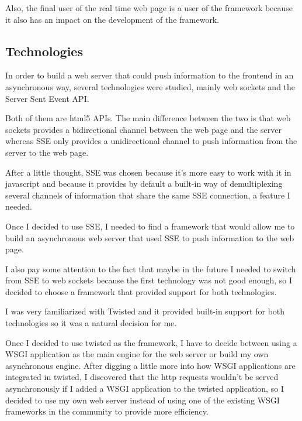 \documentclass[12pt]{article}
\begin{document}
            Also, the final user of the real time web page is a user of the
            framework because it also has an impact on the development of the
            framework.

        \subsection{Technologies}
            In order to build a web server that could push information to the
            frontend in an asynchronous way, several technologies were studied,
            mainly web sockets and the Server Sent Event API.

            Both of them are html5 APIs. The main difference between the two is
            that web sockets provides a bidirectional channel between the web
            page and the server whereas SSE only provides a unidirectional
            channel to push information from the server to the web page.

            After a little thought, SSE was chosen because it's more easy to
            work with it in javascript and because it provides by default a
            built-in way of demultiplexing several channels of information that
            share the same SSE connection, a feature I needed.
            
            Once I decided to use SSE, I needed to find a framework that would
            allow me to build an asynchronous web server that used SSE to push
            information to the web page.

            I also pay some attention to the fact that maybe in the future I
            needed to switch from SSE to web sockets because the first
            technology was not good enough, so I decided to choose a framework
            that provided support for both technologies.
            
            I was very familiarized with Twisted and it provided built-in
            support for both technologies so it was a natural decision for me.

            Once I decided to use twisted as the framework, I have to decide
            between using a WSGI application as the main engine for the web
            server or build my own asynchronous engine. After digging a little
            more into how WSGI applications are integrated in twisted, I
            discovered that the http requests wouldn't be served asynchronously
            if I added a WSGI application to the twisted application, so I
            decided to use my own web server instead of using one of the
            existing WSGI frameworks in the community to provide more
            efficiency.
\end{document}
